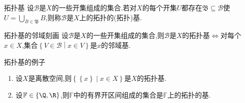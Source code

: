 \begin{definition}{拓扑基}{}
	设$\mathcal{B}$是$X$的一些开集组成的集合.若对$X$的每个开集$U$都存在$\mathfrak{B}\subseteq\mathcal{B}$使$U=\bigcup\limits_{B\in\mathfrak{B}}B$,则称$\mathcal{B}$是$X$上的拓扑的(拓扑)基.
\end{definition}

\begin{proposition}{拓扑基的邻域刻画}{}
	设$\mathcal{B}$是$X$的一些开集组成的集合,则$\mathcal{B}$是$X$的拓扑基$\iff$对每个$x\in X$,集合$\left\{V\in\mathcal{B}\middle|x\in V\right\}$是$x$的邻域基.
\end{proposition}

\begin{example}{拓扑基的例子}{}
	\begin{enumerate}
		\item 设$X$是离散空间,则$\left\{\left\{x\right\}\middle|x\in X\right\}$是$X$的拓扑基.
		\item 设$\mathbb{F}\in\left\{\Q,\R\right\}$,则$\mathbb{F}$中的有界开区间组成的集合是$\mathbb{F}$上的拓扑的基.
	\end{enumerate}
\end{example}


